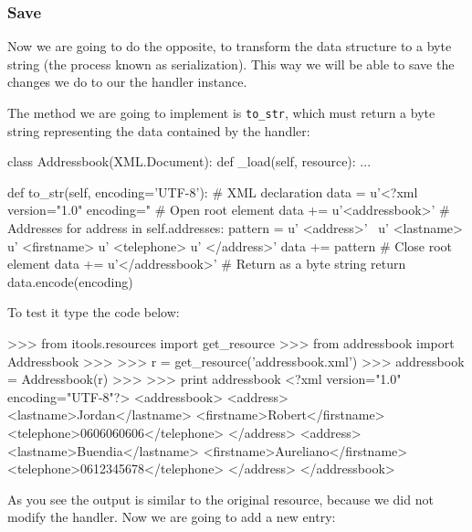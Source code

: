 \subsubsection{Save}

Now we are going to do the opposite, to transform the data structure to
a byte string (the process known as serialization). This way we will be
able to save the changes we do to our the handler instance.

The method we are going to implement is {\tt to\_str}, which must return
a byte string representing the data contained by the handler:

\begin{code}
    class Addressbook(XML.Document):
        def _load(self, resource):
            ...


        def to_str(self, encoding='UTF-8'):
            # XML declaration
            data = u'<?xml version="1.0" encoding="%
            # Open root element
            data += u'<addressbook>\n'
            # Addresses
            for address in self.addresses:
                pattern = u'  <address>\n' \
                          u'    <lastname>%
                          u'    <firstname>%
                          u'    <telephone>%
                          u'  </address>\n'
                data += pattern %
            # Close root element
            data += u'</addressbook>'
            # Return as a byte string
            return data.encode(encoding)
\end{code}

To test it type the code below:

\begin{code}
    >>> from itools.resources import get_resource
    >>> from addressbook import Addressbook
    >>>
    >>> r = get_resource('addressbook.xml')
    >>> addressbook = Addressbook(r)
    >>>
    >>> print addressbook
    <?xml version="1.0" encoding="UTF-8"?>
    <addressbook>
      <address>
        <lastname>Jordan</lastname>
        <firstname>Robert</firstname>
        <telephone>0606060606</telephone>
      </address>
      <address>
        <lastname>Buendia</lastname>
        <firstname>Aureliano</firstname>
        <telephone>0612345678</telephone>
      </address>
    </addressbook>
\end{code}

As you see the output is similar to the original resource, because we did not
modify the handler. Now we are going to add a new entry:

